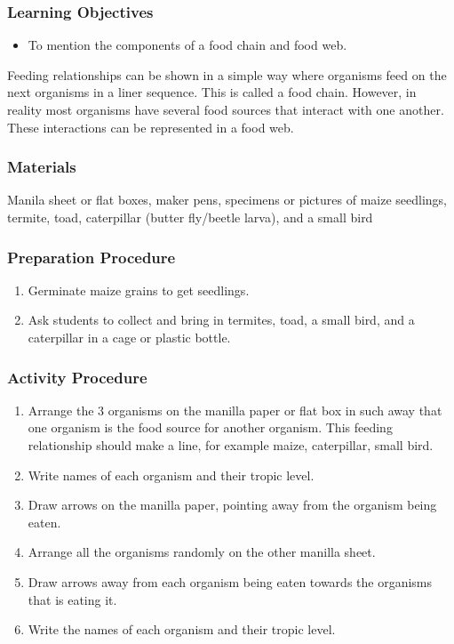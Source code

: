 \subsubsection*{Learning Objectives}
\begin{itemize}
\item{To mention the components of a food chain and food web.}
\end{itemize}


Feeding relationships can be shown in a simple way where organisms feed on the next organisms in a liner sequence. This is called a food chain. However, in reality most organisms have several food sources that interact with one another. These interactions can be represented in a food web.

\subsubsection*{Materials}
Manila sheet or flat boxes, maker pens, specimens or pictures of maize seedlings, termite, toad, caterpillar (butter fly/beetle larva), and a small bird

\subsubsection*{Preparation Procedure}
\begin{enumerate}
\item{Germinate maize grains to get seedlings.}
\item{Ask students to collect and bring in termites, toad, a small bird, and a caterpillar in a cage or plastic bottle.}
\end{enumerate}

\subsubsection*{Activity Procedure}
\begin{enumerate}

\item{Arrange the 3 organisms on the manilla paper or flat box in such away that one organism is the food source for another organism. This feeding relationship should make a line, for example maize, caterpillar, small bird.}
\item{Write names of each organism and their tropic level.}
\item{Draw arrows on the manilla paper, pointing away from the organism being eaten.}
\item{Arrange all the organisms randomly on the other manilla sheet.}
\item{Draw arrows away from each organism being eaten towards the organisms that is eating it.}
\item{Write the names of each organism and their tropic level.}

\end{enumerate}


